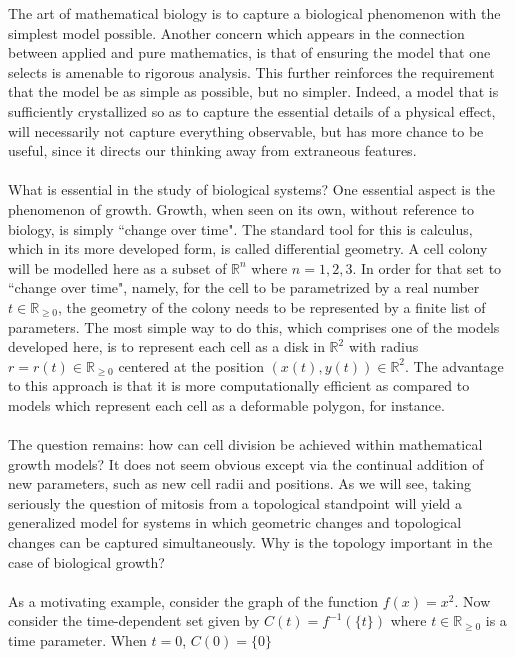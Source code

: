The art of mathematical biology is to capture a biological phenomenon with the 
simplest model possible. Another concern which appears in the connection between 
applied and pure mathematics, is that of ensuring the model that one selects is 
amenable to rigorous analysis. This further reinforces the requirement that the 
model be as simple as possible, but no simpler. Indeed, a model that is sufficiently 
crystallized so as to capture the essential details of a physical effect, will 
necessarily not capture everything observable, but has more chance to be useful, 
since it directs our thinking away from extraneous features.
\\
\\
What is essential in the study of biological systems? One essential aspect is the 
phenomenon of growth. Growth, when seen on its own, without reference to biology, 
is simply ``change over time". The standard tool for this is calculus, which in its 
more developed form, is called differential geometry. A cell colony will be modelled 
here as a subset of $\mathbb{R}^n$ where $n = 1,2,3$. In order for that set to 
``change over time", namely, for the cell to be parametrized by a real number 
$t \in \mathbb{R}_{\geq 0}$, the geometry of the colony needs to be represented 
by a finite list of parameters. The most simple way to do this, which comprises 
one of the models developed here, is to represent each cell as a disk in 
$\mathbb{R}^2$ with radius $r = r(t) \in \mathbb{R}_{\geq 0}$ centered at 
the position $(x(t),y(t)) \in \mathbb{R}^2$. The advantage to this approach 
is that it is more computationally efficient as compared to models which 
represent each cell as a deformable polygon, for instance.
\\
\\
The question remains: how can cell division be achieved within mathematical 
growth models? It does not seem obvious except via the continual addition of 
new parameters, such as new cell radii and positions. As we will see, taking 
seriously the question of mitosis from a topological standpoint will yield a 
generalized model for systems in which geometric changes and topological changes 
can be captured simultaneously. Why is the topology important in the case of biological growth? 
\\
\\
As a motivating example, consider the graph of the function $f(x) = x^2$. 
Now consider the time-dependent set given by $C(t) = f^{-1} (\{t\})$ where 
$t \in \mathbb{R}_{\geq 0}$ is a time parameter. When $t=0$, $C(0) = \{ 0\}$ 
